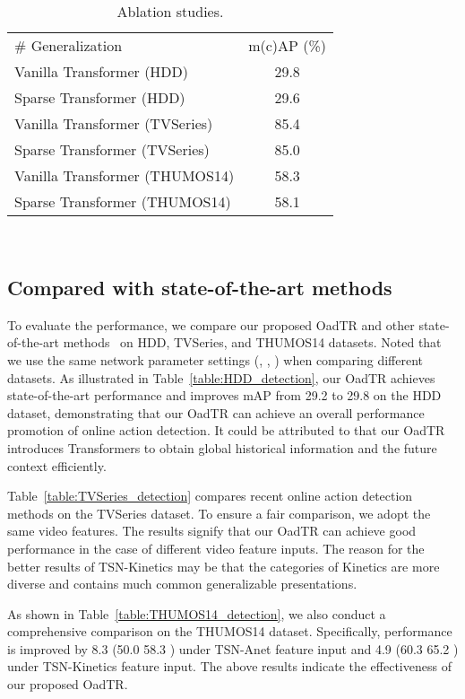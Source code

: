 \documentclass[10pt,twocolumn,letterpaper]{article}
\begin{document}
{\begin{table*}[t!]
{\begin{tabular}{l|c}
 \footnotesize
\# Generalization & \small m(c)AP (\%) \\ \shline
 Vanilla Transformer (HDD) & 29.8\\
 Sparse Transformer (HDD) & 29.6 \\
 Vanilla Transformer (TVSeries) & 85.4 \\
 Sparse Transformer (TVSeries) & 85.0 \\
 Vanilla Transformer (THUMOS14) & 58.3 \\
 Sparse Transformer (THUMOS14) & 58.1 \\
\end{tabular}}
\\
\caption{Ablation studies.
\label{table:Ablation_study}}
\vspace{-4mm}
\end{table*}\subsection{Compared with state-of-the-art methods}
To evaluate the performance, we compare our proposed OadTR and other state-of-the-art methods~\cite{RED,TRN,IDN} on HDD, TVSeries, and THUMOS14 datasets.
Noted that we use the same network parameter settings (\eg, , ) when comparing different datasets. 
As illustrated in Table~\ref{table:HDD_detection}, our OadTR achieves state-of-the-art performance and improves mAP from 29.2 to 29.8 on the HDD dataset, demonstrating that our OadTR can achieve an overall performance promotion of online action detection. It could be attributed to that our OadTR introduces Transformers to obtain global historical information and the future context efficiently.

Table~\ref{table:TVSeries_detection} compares recent online action detection methods on the TVSeries dataset. To ensure a fair comparison, we adopt the same video features. The results signify that our OadTR can achieve good performance in the case of different video feature inputs. The reason for the better results of TSN-Kinetics may be that the categories of Kinetics are more diverse and contains much common generalizable presentations. 

As shown in Table~\ref{table:THUMOS14_detection}, we also conduct a comprehensive comparison on the THUMOS14 dataset. Specifically, performance is improved by 8.3 (50.0  58.3 ) under TSN-Anet feature input and 4.9 (60.3  65.2 ) under TSN-Kinetics feature input. The above results indicate the effectiveness of our proposed OadTR. 


}
\end{document}

